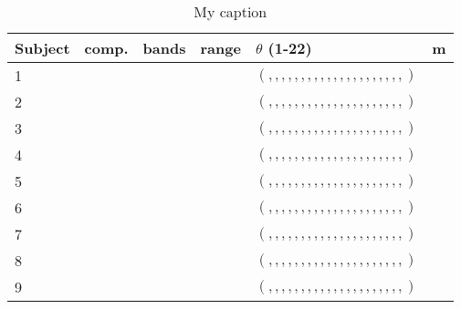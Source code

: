 \begin{table}[H]
\centering
\caption{My caption}
\label{my-label}
\begin{adjustbox}{width=1.0\textwidth,center}
\begin{tabular}{@{}llllll@{}}
\toprule
\textbf{Subject} & \textbf{comp.} & \textbf{bands} & \textbf{range} & \textbf{$\theta$ (1-22)}  & \textbf{m} \\ \midrule
1                &                &                &                & $(,,,,,,,,,,,,,,,,,,,,,)$ &            \\
2                &                &                &                & $(,,,,,,,,,,,,,,,,,,,,,)$ &            \\
3                &                &                &                & $(,,,,,,,,,,,,,,,,,,,,,)$ &            \\
4                &                &                &                & $(,,,,,,,,,,,,,,,,,,,,,)$ &            \\
5                &                &                &                & $(,,,,,,,,,,,,,,,,,,,,,)$ &            \\
6                &                &                &                & $(,,,,,,,,,,,,,,,,,,,,,)$ &            \\
7                &                &                &                & $(,,,,,,,,,,,,,,,,,,,,,)$ &            \\
8                &                &                &                & $(,,,,,,,,,,,,,,,,,,,,,)$ &            \\
9                &                &                &                & $(,,,,,,,,,,,,,,,,,,,,,)$ &            \\ \bottomrule
\end{tabular}%
\end{adjustbox}
\end{table}